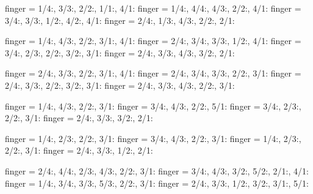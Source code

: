 \documentclass[../main.tex]{subfiles}
\begin{document}

  {finger = {1/4:\R, 3/3:, 2/2:, 1/1:, 4/1:}}
  {finger = {1/4:, 4/4:, 4/3:, 2/2:\R, 4/1:}}
  {finger = {3/4:, 3/3:\R, 1/2:, 4/2:, 4/1:}}
  {finger = {2/4:, 1/3:, 4/3:, 2/2:, 2/1:\R}}

  {finger = {1/4:\R, 4/3:, 2/2:, 3/1:, 4/1:}}
  {finger = {2/4:, 3/4:, 3/3:, 1/2:\R, 4/1:}}
  {finger = {3/4:, 2/3:\R, 2/2:, 3/2:, 3/1:}}
  {finger = {2/4:, 3/3:, 4/3:, 3/2:, 2/1:\R}}

  {finger = {2/4:, 3/3:, 2/2:, 3/1:, 4/1:}}
  {finger = {2/4:, 3/4:, 3/3:, 2/2:, 3/1:}}
  {finger = {2/4:, 3/3:, 2/2:, 3/2:, 3/1:}}
  {finger = {2/4:, 3/3:, 4/3:, 2/2:, 3/1:}}

  {finger = {1/4:\R, 4/3:, 2/2:, 3/1:}}
  {finger = {3/4:, 4/3:, 2/2:\R, 5/1:}}
  {finger = {3/4:, 2/3:\R, 2/2:, 3/1:}}
  {finger = {2/4:, 3/3:, 3/2:, 2/1:\R}}

  {finger = {1/4:\R, 2/3:, 2/2:, 3/1:}}
  {finger = {3/4:, 4/3:, 2/2:\R, 3/1:}}
  {finger = {1/4:, 2/3:\R, 2/2:, 3/1:}}
  {finger = {2/4:, 3/3:, 1/2:, 2/1:\R}}

  {finger = {2/4:, 4/4:, 2/3:, 4/3:, 2/2:, 3/1:}}
  {finger = {3/4:, 4/3:, 3/2:, 5/2:, 2/1:, 4/1:}}
  {finger = {1/4:, 3/4:, 3/3:, 5/3:, 2/2:, 3/1:}}
  {finger = {2/4:, 3/3:, 1/2:, 3/2:, 3/1:, 5/1:}}


\end{document}
